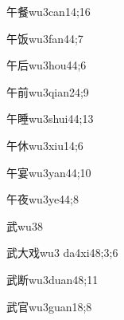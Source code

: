 \begin{verbete}{午餐}{wu3can1}{4;16}
\end{verbete}

\begin{verbete}{午饭}{wu3fan4}{4;7}
\end{verbete}

\begin{verbete}{午后}{wu3hou4}{4;6}
\end{verbete}

\begin{verbete}{午前}{wu3qian2}{4;9}
\end{verbete}

\begin{verbete}{午睡}{wu3shui4}{4;13}
\end{verbete}

\begin{verbete}{午休}{wu3xiu1}{4;6}
\end{verbete}

\begin{verbete}{午宴}{wu3yan4}{4;10}
\end{verbete}

\begin{verbete}{午夜}{wu3ye4}{4;8}
\end{verbete}

\begin{verbete}{武}{wu3}{8}
\end{verbete}

\begin{verbete}{武大戏}{wu3 da4xi4}{8;3;6}
\end{verbete}

\begin{verbete}{武断}{wu3duan4}{8;11}
\end{verbete}

\begin{verbete}{武官}{wu3guan1}{8;8}
\end{verbete}

